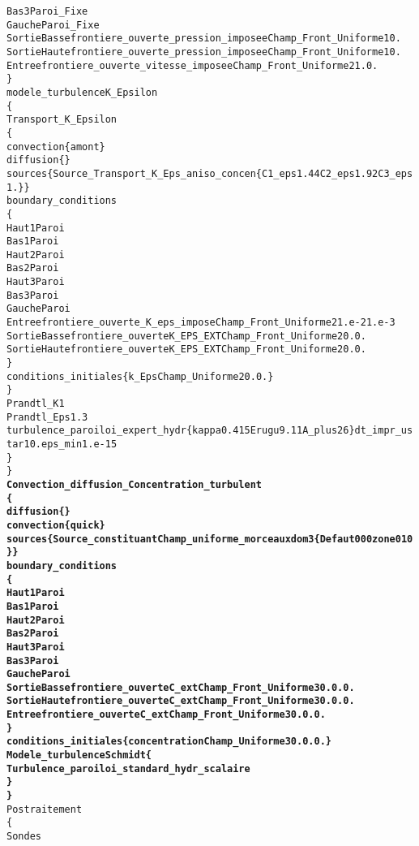 \begin{alltt}
             Bas3 Paroi_Fixe
             Gauche Paroi_Fixe
             SortieBasse frontiere_ouverte_pression_imposee Champ_Front_Uniforme 1 0.
             SortieHaute frontiere_ouverte_pression_imposee Champ_Front_Uniforme 1 0.
             Entree frontiere_ouverte_vitesse_imposee Champ_Front_Uniforme 2  1. 0.
        \}
        modele_turbulence K_Epsilon
        \{
            Transport_K_Epsilon 
            \{
                convection \{ amont \}
                diffusion \{ \}
                sources \{ Source_Transport_K_Eps_aniso_concen \{ C1_eps 1.44 C2_eps 1.92 C3_eps 1. \} \}
                boundary_conditions
                \{
                    Haut1 Paroi
                    Bas1 Paroi
                    Haut2 Paroi
                    Bas2 Paroi
                    Haut3 Paroi
                    Bas3 Paroi
                    Gauche Paroi
                    Entree frontiere_ouverte_K_eps_impose Champ_Front_Uniforme 2 1.e-2 1.e-3
                    SortieBasse frontiere_ouverte K_EPS_EXT Champ_Front_Uniforme 2 0. 0.
                    SortieHaute frontiere_ouverte K_EPS_EXT Champ_Front_Uniforme 2 0. 0.
                \}
                conditions_initiales \{ k_Eps Champ_Uniforme 2 0. 0. \}
             \}
             Prandtl_K 1
             Prandtl_Eps 1.3
             turbulence_paroi loi_expert_hydr \{ kappa 0.415 Erugu 9.11 A_plus 26 \} dt_impr_ustar 10. eps_min 1.e-15
        \}
    \}
    {\bf{Convection_diffusion_Concentration_turbulent }}
    {\bf{\{ }}
        {\bf{diffusion \{ \} }}
        {\bf{convection \{ quick \} }}
        {\bf{sources \{ Source_constituant Champ_uniforme_morceaux dom 3 \{ Defaut 0 0 0 zone 0 1 0 \} \} }}
        {\bf{boundary_conditions }}
        {\bf{\{ }}
             {\bf{Haut1          Paroi }}
             {\bf{Bas1           Paroi }}
             {\bf{Haut2          Paroi }}
             {\bf{Bas2           Paroi }}
             {\bf{Haut3          Paroi }}
             {\bf{Bas3           Paroi }}
             {\bf{Gauche         Paroi }}
             {\bf{SortieBasse    frontiere_ouverte C_ext Champ_Front_Uniforme 3 0. 0. 0. }}
             {\bf{SortieHaute    frontiere_ouverte C_ext Champ_Front_Uniforme 3 0. 0. 0. }}
             {\bf{Entree         frontiere_ouverte C_ext Champ_Front_Uniforme 3 0. 0. 0. }}
        {\bf{\} }}
        {\bf{conditions_initiales \{ concentration Champ_Uniforme 3 0. 0. 0. \} }}
        {\bf{Modele_turbulence Schmidt \{ }}
            {\bf{Turbulence_paroi loi_standard_hydr_scalaire }}
        {\bf{\} }}
    {\bf{\} }}
    Postraitement 
    \{
        Sondes 

\end{alltt}
